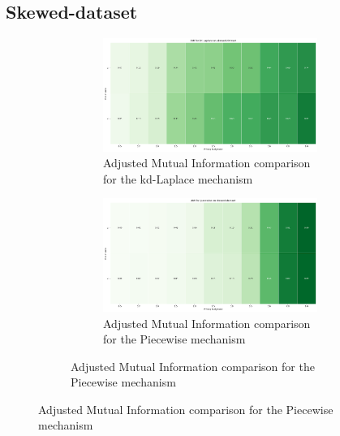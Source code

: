 \subsection{Skewed-dataset}
\begin{figure}[H]
    \centering
    \begin{subfigure}[b]{0.85\textwidth}
        \begin{subfigure}[c]{1\textwidth}
            \includegraphics[width=1\textwidth]{Results/kd-laplace/kd-Laplace/skewed-dataset/ami.png}
            \caption{Adjusted Mutual Information comparison for the kd-Laplace mechanism}
            \label{fig:ami_skewed-dataset_comparison_kdlaplace_2d}
        \end{subfigure}
        \vfill %
        \begin{subfigure}[c]{1\textwidth}
            \includegraphics[width=1\textwidth]{Results/kd-laplace/piecewise/skewed-dataset/ami.png}
            \caption{Adjusted Mutual Information comparison for the Piecewise mechanism}
            \label{fig:ami_skewed-dataset_comparison_piecewise_2d}
        \end{subfigure}
    \end{subfigure}

\end{figure}
